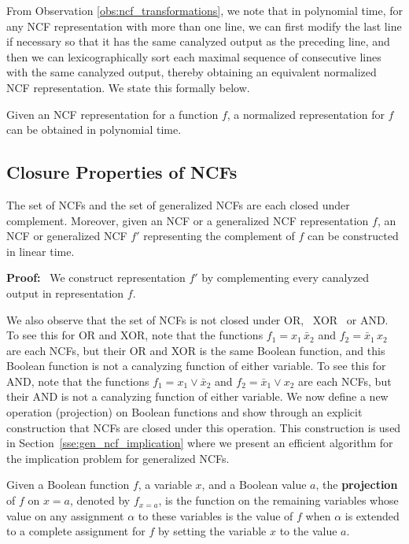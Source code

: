 \medskip
From Observation \ref{obs:ncf_transformations},
we note that in polynomial time, for any NCF representation with more than one line,
we can first modify the last line if necessary so that it has the same canalyzed output as the preceding line,
and then we can lexicographically sort
each maximal sequence of consecutive lines with the same canalyzed output,
thereby obtaining an equivalent normalized NCF representation.
We state this formally below.

\begin{observation}\label{obs:normalization_poly}
Given an NCF representation for a function $f$, a normalized
representation for $f$ can be obtained in polynomial time. \QED
\end{observation}

\subsection{Closure Properties of NCFs}

\begin{observation}\label{complement}
The set of NCFs and the set of generalized NCFs
are each closed under complement.
Moreover, given an NCF or a generalized NCF representation $f$, 
an NCF or generalized NCF $f'$ representing the complement of $f$ 
can be constructed in linear time.
\end{observation}

\noindent
\textbf{Proof:}~ We construct
representation $f'$ by complementing 
every canalyzed output in representation $f$.  \QED

\medskip
We also observe that the set of NCFs is not closed under OR,~ XOR~ or AND.
To see this for OR and XOR,  note that the functions 
$f_1 = x_1 \, \bar{x}_2$ and $f_2 = \bar{x}_1 \, x_2$
are each NCFs, but their OR and XOR is the same Boolean function,
and this Boolean function is not  a canalyzing function of either variable.
To see this for AND, note that the functions 
$f_1 = x_1 \vee \bar{x}_2$ and $f_2 = \bar{x}_1 \vee x_2$
are each NCFs, but their AND is not  a canalyzing function of either variable.
We now define a new operation (projection) on Boolean functions 
and show through an explicit construction that
NCFs are closed under this operation.
This construction is used in Section~\ref{sse:gen_ncf_implication}
where we present an efficient algorithm for the implication problem
for generalized NCFs. 

\begin{definition}\label{def:projection}
Given a Boolean function $f$, a variable $x$, and a Boolean value $a$,
the {\bf projection} of $f$ on $x = a$,
denoted by $f_{x = a}$, is the function on the remaining variables
whose value on any assignment $\alpha$ to these variables
is the value of $f$ when $\alpha$ is extended to a complete assignment for $f$
by setting the variable $x$ to the value $a$.
\end{definition}

